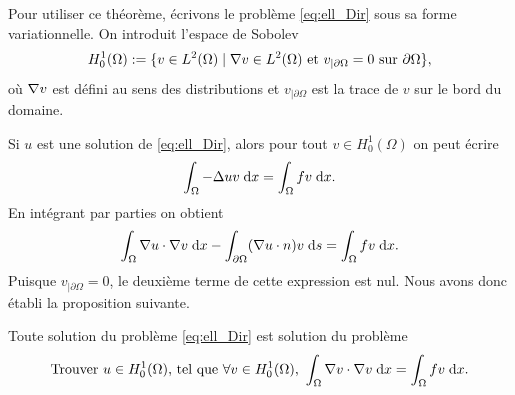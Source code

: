 \documentclass[12pt,a4paper,twoside]{article}
\begin{document}

Pour utiliser ce th\'eor\`eme, \'ecrivons le probl\`eme \eqref{eq:ell_Dir} sous
sa forme variationnelle.
On introduit l'espace de Sobolev
\begin{align}
  H_0^1(\Omega) := \{ v \in L^2(\Omega) \; | \; \nabla v \in L^2(\Omega) 
  \text{ et } v_{| \partial \Omega} = 0 \text{ sur } \partial \Omega \} ,
\end{align}
o\`u $\nabla v$ est d\'efini au sens des distributions et $v_{|\partial \Omega}$
est la trace de $v$ sur le bord du domaine.


Si $u$ est une solution de \eqref{eq:ell_Dir}, alors pour tout $v \in H^1_0(\Omega)$
on peut \'ecrire
\begin{align*}
  \int_{\Omega} - \Delta u v \;\mathrm{d} x = \int_{\Omega} f v \;\mathrm{d} x .
\end{align*}
En int\'egrant par parties on obtient 
\begin{align*}
  \int_{\Omega} \nabla u \cdot \nabla v \;\mathrm{d} x 
  - \int_{\partial \Omega} (\nabla u \cdot n) v \;\mathrm{d} s = \int_{\Omega} f v \;\mathrm{d} x .
\end{align*}
Puisque $v_{|\partial \Omega} = 0$, le deuxi\`eme terme de cette expression est nul.
Nous avons donc \'etabli la proposition suivante.
\begin{proposition}
  Toute solution du probl\`eme \eqref{eq:ell_Dir} est solution du probl\`eme 
  \begin{equation}
    \label{eq:LM2}
    \text{Trouver $u \in H_0^1(\Omega)$, tel que $\forall v \in H_0^1(\Omega)$, } 
    \int_{\Omega} \nabla v \cdot \nabla v \;\mathrm{d} x = \int_{\Omega} f v \;\mathrm{d} x .
  \end{equation}
\end{proposition}
\end{document}
